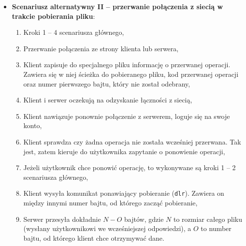 \documentclass[10pt,a4paper]{article}
\begin{document}
\begin{itemize}
    \item \textbf{Scenariusz alternatywny II -- przerwanie połączenia z siecią w trakcie pobierania pliku}:
    \begin{enumerate}
        \item Kroki 1 -- 4 scenariusza głównego,
        \item Przerwanie połączenia ze strony klienta lub serwera,
        \item Klient zapisuje do specjalnego pliku informację o przerwanej operacji. Zawiera się w niej ścieżka do pobieranego pliku, kod przerwanej operacji oraz numer pierwszego bajtu, który nie został odebrany,
        \item Klient i serwer oczekują na odzyskanie łączności z siecią,
        \item Klient nawiązuje ponownie połączenie z serwerem, loguje się na swoje konto,
        \item Klient sprawdza czy żadna operacja nie została wcześniej przerwana. Tak jest, zatem kieruje do użytkownika zapytanie o ponowienie operacji,
        \item Jeżeli użytkownik chce ponowić operację, to wykonywane są kroki 1 -- 2 scenariusza głównego,
        \item Klient wysyła komunikat ponawiający pobieranie (\texttt{dlr}). Zawiera on między innymi numer bajtu, od którego zacząć pobieranie,
        \item Serwer przesyła dokładnie $N - O$ bajtów, gdzie $N$ to rozmiar całego pliku (wysłany użytkownikowi we wcześniejszej odpowiedzi), a $O$ to number bajtu, od którego klient chce otrzymywać dane.
    \end{enumerate}
\end{itemize}
\end{document}
